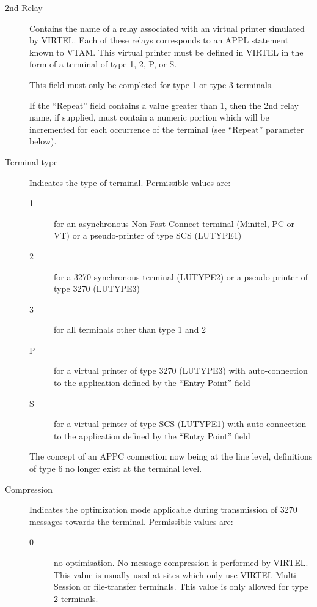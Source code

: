 \documentclass[letterpaper,10pt,english]{sphinxmanual}
\begin{document}
\begin{description}
\item[{2nd Relay}] \leavevmode
Contains the name of a relay associated with an virtual printer simulated by VIRTEL. Each of these relays corresponds to an APPL statement known to VTAM. This virtual printer must be defined in VIRTEL in the form of a terminal of type
1, 2, P, or S.

This field must only be completed for type 1 or type 3 terminals.

If the “Repeat” field contains a value greater than 1, then the 2nd relay name, if supplied, must contain a numeric portion which will be incremented for each occurrence of the terminal (see “Repeat” parameter below).

\item[{Terminal type}] \leavevmode
Indicates the type of terminal. Permissible values are:
\begin{description}
\item[{1}] \leavevmode
for an asynchronous Non Fast-Connect terminal (Minitel, PC or VT) or a pseudo-printer of type SCS (LUTYPE1)

\item[{2}] \leavevmode
for a 3270 synchronous terminal (LUTYPE2) or a pseudo-printer of type 3270 (LUTYPE3)

\item[{3}] \leavevmode
for all terminals other than type 1 and 2

\item[{P}] \leavevmode
for a virtual printer of type 3270 (LUTYPE3) with auto-connection to the application defined by the “Entry Point” field

\item[{S}] \leavevmode
for a virtual printer of type SCS (LUTYPE1) with auto-connection to the application defined by the “Entry Point” field

\end{description}

The concept of an APPC connection now being at the line level, definitions of type 6 no longer exist at the terminal
level.

\item[{Compression}] \leavevmode
Indicates the optimization mode applicable during transmission of 3270 messages towards the terminal. Permissible values are:
\begin{description}
\item[{0}] \leavevmode
no optimisation.
No message compression is performed by VIRTEL. This value is usually used at sites which only use VIRTEL Multi-Session or file-transfer terminals. This value is only allowed for type 2 terminals.


\end{description}
\end{description}
\end{document}

